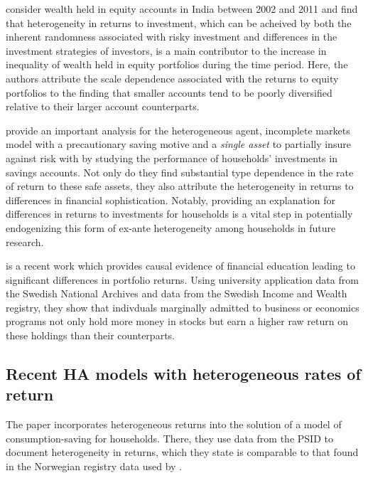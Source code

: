 \par \cite{Campbell2019} consider wealth held in equity accounts in India between 2002 and 2011 and find that heterogeneity in returns to investment, which can be acheived by both the inherent randomness associated with risky investment and differences in the investment strategies of investors, is a main contributor to the increase in inequality of wealth held in equity portfolios during the time period. Here, the authors attribute the scale dependence associated with the returns to equity portfolios to the finding that smaller accounts tend to be poorly diversified relative to their larger account counterparts. 

\par \cite{Deuflhard2018} provide an important analysis for the heterogeneous agent, incomplete markets model with a precautionary saving motive and a \textit{single asset} to partially insure against risk with by studying the performance of households' investments in savings accounts. Not only do they find substantial type dependence in the rate of return to these safe assets, they also attribute the heterogeneity in returns to differences in financial sophistication. Notably, providing an explanation for differences in returns to investments for households is a vital step in potentially endogenizing this form of ex-ante heterogeneity among households in future research.

\par \cite{altmejd2024} is a recent work which provides causal evidence of financial education leading to significant differences in portfolio returns. Using university application data from the Swedish National Archives and data from the Swedish Income and Wealth registry, they show that indivduals marginally admitted to business or economics programs not only hold more money in stocks but earn a higher raw return on these holdings than their counterparts.


\subsection{Recent HA models with heterogeneous rates of return}

\par The paper \cite{Daminato2024} incorporates heterogeneous returns into the solution of a model of consumption-saving for households. There, they use data from the PSID to document heterogeneity in returns, which they state is comparable to that found in the Norwegian registry data used by \cite{aflgdmlp20}.

